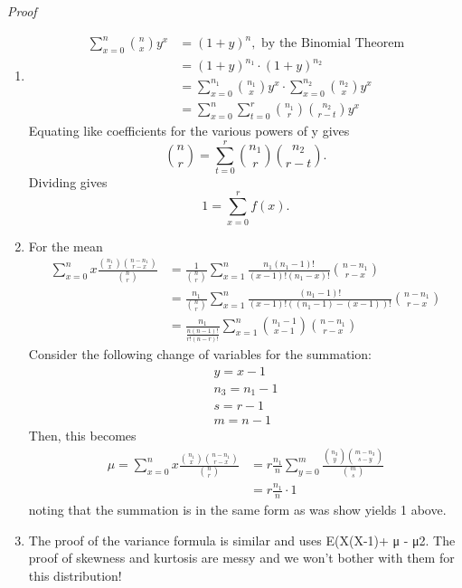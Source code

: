 \documentclass[10pt,]{book}
\makeatletter
\renewcommand*{\proofname}{Proof}
\renewenvironment{proof}[1][\proofname]{\par
  \pushQED{\qed}%
  \normalfont \topsep6\p@\@plus6\p@\relax
  \trivlist
  \item\relax
    {\itshape
    #1\@addpunct{.}}\hspace\labelsep\ignorespaces
}{%
  \popQED\endtrivlist\@endpefalse
}
\numberwithin{equation}{section}
\makeatother
\begin{document}
\begin{proof}\hypertarget{proof-38}{}
\hypertarget{p-810}{}%
\leavevmode%
\begin{enumerate}
\item\hypertarget{li-223}{}\hypertarget{p-811}{}%
%
\begin{align*}
\sum_{x=0}^n \binom{n}{x} y^x & = (1+y)^n, \text{ by the Binomial Theorem}\\
& = (1+y)^{n_1} \cdot (1+y)^{n_2} \\
& = \sum_{x=0}^{n_1} \binom{n_1}{x} y^x \cdot \sum_{x=0}^{n_2} \binom{n_2}{x} y^x \\
& = \sum_{x=0}^n \sum_{t=0}^r \binom{n_1}{r} \binom{n_2}{r-t} y^x
\end{align*}
Equating like coefficients for the various powers of y gives%
\begin{equation*}
\binom{n}{r} = \sum_{t=0}^r \binom{n_1}{r} \binom{n_2}{r-t}.
\end{equation*}
Dividing gives%
\begin{equation*}
1 = \sum_{x=0}^r f(x).
\end{equation*}
%
\item\hypertarget{li-224}{}\hypertarget{p-812}{}%
For the mean%
\begin{align*}
\sum_{x=0}^n x \frac{\binom{n_1}{x} \binom{n-n_1}{r-x}}{\binom{n}{r}} & = 
\frac{1}{\binom{n}{r}} \sum_{x=1}^n  \frac{n_1(n_1-1)!}{(x-1)!(n_1-x)!}  \binom{n-n_1}{r-x}				\\
& = \frac{n_1}{\binom{n}{r}} \sum_{x=1}^n  \frac{(n_1-1)!}{(x-1)!((n_1-1)-(x-1))!}  \binom{n-n_1}{r-x} \\
& = \frac{n_1}{\frac{n(n-1)!}{r!(n-r)!}} \sum_{x=1}^n  \binom{n_1-1}{x-1}  \binom{n-n_1}{r-x} 
\end{align*}
Consider the following change of variables for the summation:%
\begin{gather*}
y = x-1\\
n_3 = n_1-1\\
s = r-1\\
m = n-1
\end{gather*}
Then, this becomes%
\begin{align*}
\mu = \sum_{x=0}^n x \frac{\binom{n_1}{x} \binom{n-n_1}{r-x}}{\binom{n}{r}} & = r \frac{n_1}{n} \sum_{y=0}^m  \frac{\binom{n_3}{y} \binom{m-n_3}{s-y}}{\binom{m}{s}}\\
& = r \frac{n_1}{n} \cdot 1
\end{align*}
noting that the summation is in the same form as was show yields 1 above.%
\item\hypertarget{li-225}{}\hypertarget{p-813}{}%
The proof of the variance formula is similar and uses E(X(X-1)+ μ - μ2. The proof of skewness and kurtosis are messy and we won’t bother with them for this distribution!%
\end{enumerate}
%
\end{proof}
\end{document}
